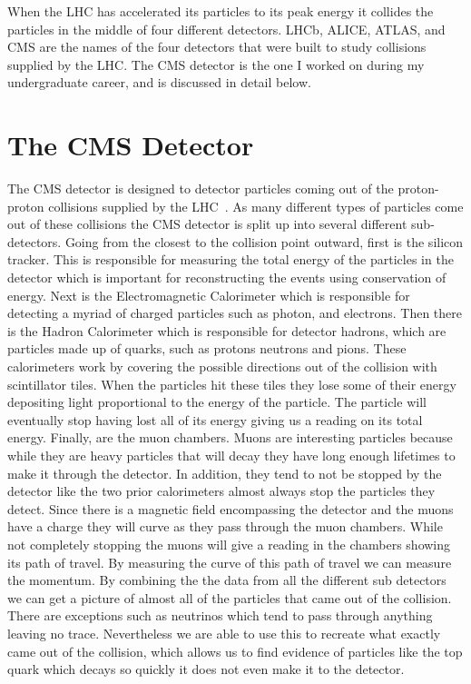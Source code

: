 When the LHC has accelerated its particles to its peak energy it collides the particles in the middle of four different detectors. LHCb, ALICE, ATLAS, and CMS are the names of the four detectors that were built to study collisions supplied by the LHC. The CMS detector is the one I worked on during my undergraduate career, and is discussed in detail below.

\section{The CMS Detector}
The CMS detector is designed to detector particles coming out of the proton-proton collisions supplied by the LHC~\cite{CMS}. As many different types of particles come out of these collisions the CMS detector is split up into several different sub-detectors. Going from the closest to the collision point outward, first is the silicon tracker. This is responsible for measuring the total energy of the particles in the detector which is important for reconstructing the events using conservation of energy. Next is the Electromagnetic Calorimeter which is responsible for detecting a myriad of charged particles such as photon, and electrons. Then there is the Hadron Calorimeter which is responsible for detector hadrons, which are particles made up of quarks, such as protons neutrons and pions. These calorimeters work by covering the possible directions out of the collision with scintillator tiles. When the particles hit these tiles they lose some of their energy depositing light proportional to the energy of the particle. The particle will eventually stop having lost all of its energy giving us a reading on its total energy. Finally, are the muon chambers. Muons are interesting particles because while they are heavy particles that will decay they have long enough lifetimes to make it through the detector. In addition, they tend to not be stopped by the detector like the two prior calorimeters almost always stop the particles they detect. Since there is a magnetic field encompassing the detector and the muons have a charge they will curve as they pass through the muon chambers. While not completely stopping the muons will give a reading in the chambers showing its path of travel. By measuring the curve of this path of travel we can measure the momentum. By combining the the data from all the different sub detectors we can get a picture of almost all of the particles that came out of the collision. There are exceptions such as neutrinos which tend to pass through anything leaving no trace. Nevertheless we are able to use this to recreate what exactly came out of the collision, which allows us to find evidence of particles like the top quark which decays so quickly it does not even make it to the detector.

